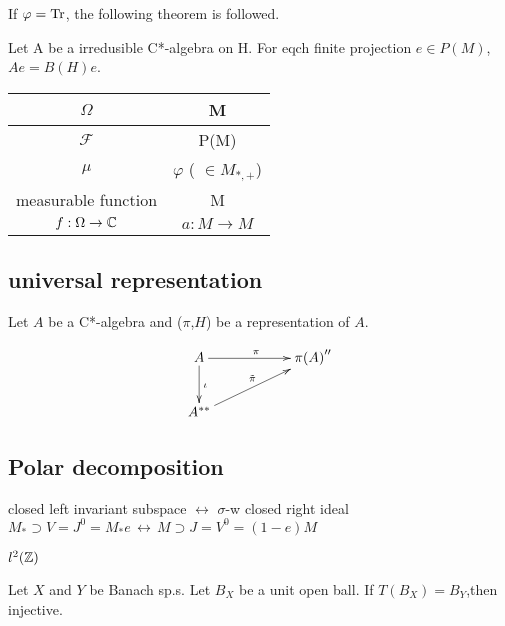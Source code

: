 If $\varphi = {\rm Tr}$, the following theorem is followed.

\begin{theorem}
Let A be a irredusible C*-algebra on H. For eqch finite projection $e \in P(M)$, $Ae=B(H)e$.
\end{theorem}

\begin{table}[h]
  \begin{tabular}{|c|c|}\hline
    $\Omega$ & M \\ \hline
    $\mathcal{F}$ & P(M)  \\ \hline
    $\mu$ &$\varphi$ ( $\in M_{*,+}$) \\ \hline
    measurable function & M \\ \hline
    $f:\Omega \rightarrow \mathbb{C}$ & $a:M \rightarrow M$ \\ \hline
  \end{tabular}
\end{table}

\subsection{universal representation}
\begin{theorem}
Let $A$ be a C*-algebra and ($\pi$,$H$) be a representation of $A$. 
\begin{figure}[h]
$$
\xymatrix{
A \ar[rr]^{\pi}  \ar[d]^{\iota}&  & {\pi(A)}'' \\
A^{**} \ar[urr]^{\tilde{\pi}} 
}
$$
\end{figure}
\end{theorem}

\subsection{Polar decomposition}
\begin{theorem}
closed left invariant subspace $\longleftrightarrow$ $\sigma$-w closed right ideal \\
$M_{*} \supset V = J^{0} = M_{*} e \, \longleftrightarrow \, M \supset J = V^{0} =(1-e)M$
\end{theorem}

\begin{example}
  $l^2(\mathbb{Z})$
\end{example}
  
\begin{theorem}
Let $X$ and  $Y$ be Banach sp.s. Let $B_X$ be a unit open ball. If $T(B_X)=B_Y$,then injective.
\end{theorem}

